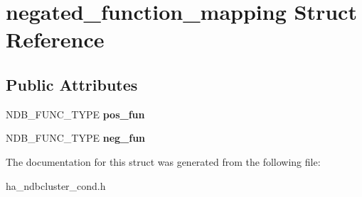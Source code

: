 \hypertarget{structnegated__function__mapping}{}\section{negated\+\_\+function\+\_\+mapping Struct Reference}
\label{structnegated__function__mapping}
\subsection*{Public Attributes}
\begin{DoxyCompactItemize}
\item 
\mbox{\label{structnegated__function__mapping_a6070c95853e4009d1edaa19fea1c24d6}} 
N\+D\+B\+\_\+\+F\+U\+N\+C\+\_\+\+T\+Y\+PE {\bfseries pos\+\_\+fun}
\item 
\mbox{\label{structnegated__function__mapping_a0dc5916ac10bd602887e8c70ba75f076}} 
N\+D\+B\+\_\+\+F\+U\+N\+C\+\_\+\+T\+Y\+PE {\bfseries neg\+\_\+fun}
\end{DoxyCompactItemize}


The documentation for this struct was generated from the following file\+:\begin{DoxyCompactItemize}
\item 
ha\+\_\+ndbcluster\+\_\+cond.\+h\end{DoxyCompactItemize}
